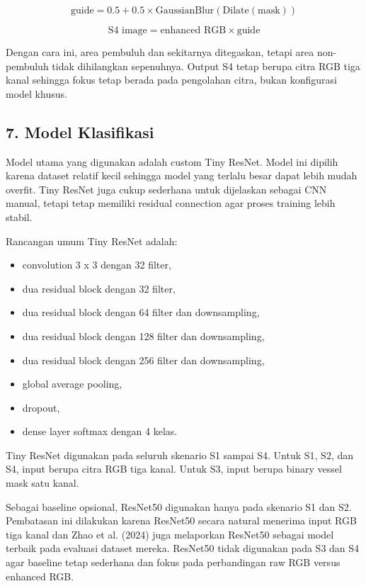 \documentclass[12pt,a4paper]{article}
\begin{document}
\[
\text{guide} = 0.5 + 0.5 \times \text{GaussianBlur}(\text{Dilate}(\text{mask}))
\]

\[
\text{S4 image} = \text{enhanced RGB} \times \text{guide}
\]

Dengan cara ini, area pembuluh dan sekitarnya ditegaskan, tetapi area non-pembuluh tidak dihilangkan sepenuhnya. Output S4 tetap berupa citra RGB tiga kanal sehingga fokus tetap berada pada pengolahan citra, bukan konfigurasi model khusus.

\subsection*{7. Model Klasifikasi}

Model utama yang digunakan adalah custom Tiny ResNet. Model ini dipilih karena dataset relatif kecil sehingga model yang terlalu besar dapat lebih mudah overfit. Tiny ResNet juga cukup sederhana untuk dijelaskan sebagai CNN manual, tetapi tetap memiliki residual connection agar proses training lebih stabil.

Rancangan umum Tiny ResNet adalah:

\begin{itemize}
  \item convolution 3 x 3 dengan 32 filter,
  \item dua residual block dengan 32 filter,
  \item dua residual block dengan 64 filter dan downsampling,
  \item dua residual block dengan 128 filter dan downsampling,
  \item dua residual block dengan 256 filter dan downsampling,
  \item global average pooling,
  \item dropout,
  \item dense layer softmax dengan 4 kelas.
\end{itemize}

Tiny ResNet digunakan pada seluruh skenario S1 sampai S4. Untuk S1, S2, dan S4, input berupa citra RGB tiga kanal. Untuk S3, input berupa binary vessel mask satu kanal.

Sebagai baseline opsional, ResNet50 digunakan hanya pada skenario S1 dan S2. Pembatasan ini dilakukan karena ResNet50 secara natural menerima input RGB tiga kanal dan Zhao et al. (2024) juga melaporkan ResNet50 sebagai model terbaik pada evaluasi dataset mereka. ResNet50 tidak digunakan pada S3 dan S4 agar baseline tetap sederhana dan fokus pada perbandingan raw RGB versus enhanced RGB.
\end{document}

